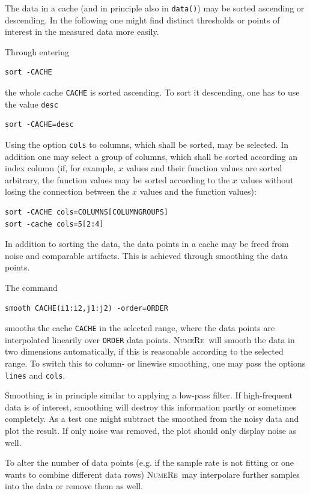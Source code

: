 \documentclass[DIV=14,headsepline,footsepline]{scrbook}
\newcommand{\NR}{\textsc{Nu\-me\-Re}}
\begin{document}
				The data in a cache (and in principle also in \lstinline+data()+) may be sorted ascending or descending. In the following one might find distinct thresholds or points of interest in the measured data more easily.
				
				Through entering
				\begin{lstlisting}
sort -CACHE
				\end{lstlisting}
				the whole cache \lstinline+CACHE+ is sorted ascending. To sort it descending, one has to use the value \lstinline+desc+
				\begin{lstlisting}
sort -CACHE=desc
				\end{lstlisting}
				Using the option \lstinline+cols+ to columns, which shall be sorted, may be selected. In addition one may select a group of columns, which shall be sorted according an index column (if, for example, $x$ values and their function values are sorted arbitrary, the function values may be sorted according to the $x$ values without losing the connection between the  $x$ values and the function values):
				\begin{lstlisting}
sort -CACHE cols=COLUMNS[COLUMNGROUPS]
sort -cache cols=5[2:4]
				\end{lstlisting}
				
				In addition to sorting the data, the data points in a cache may be freed from noise and comparable artifacts. This is achieved through smoothing the data points.
				
				The command
				\begin{lstlisting}
smooth CACHE(i1:i2,j1:j2) -order=ORDER
				\end{lstlisting}
				smooths the cache \lstinline+CACHE+ in the selected range, where the data points are interpolated linearily over \lstinline+ORDER+ data points. \NR\ will smooth the data in two dimensions automatically, if this is reasonable according to the selected range. To switch this to column- or linewise smoothing, one may pass the options \lstinline+lines+ and \lstinline+cols+.
				
				Smoothing is in principle similar to applying a low-pass filter. If high-frequent data is of interest, smoothing will destroy this information partly or sometimes completely. As a test one might subtract the smoothed from the noisy data and plot the result. If only noise was removed, the plot should only display noise as well.
				
				To alter the number of data points (e.g. if the sample rate is not fitting or one wants to combine different data rows) \NR\ may interpolare further samples into the data or remove them as well.
				
\end{document}
